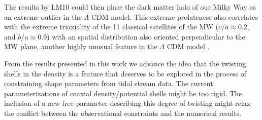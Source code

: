 \documentclass[a4paper,fleqn,usenatbib]{mnras}
\begin{document}
The results by LM10 could then place the dark matter halo of our Milky
Way as an extreme outlier in the $\Lambda$ CDM model. 
This extreme prolateness also correlates with the extreme
triaxiality of the 11 classical satellites of the MW ($c/a\approx
0.2$, and $b/a\approx0.9$) with an spatial distribution 
also oriented perpendicular to the MW plane, another highly unusual
feature in the $\Lambda$ CDM model \citep{2018MNRAS.478.5533F}.

From the results presented in this work we advance the idea that the
twisting shells in the density is a feature that deserves to be
explored in the process of constraining shape parameters from tidal
stream data. 
The current parameterizations of coaxial density/potential shells
might be too rigid.
The inclusion of a new free parameter describing this degree of
twisting might relax the conflict between the observational
constraints and the numerical results. 
\end{document}
